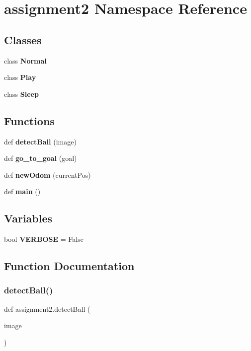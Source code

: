 \section{assignment2 Namespace Reference}
\label{namespaceassignment2}
\subsection*{Classes}
\begin{DoxyCompactItemize}
\item 
class \textbf{ Normal}
\item 
class \textbf{ Play}
\item 
class \textbf{ Sleep}
\end{DoxyCompactItemize}
\subsection*{Functions}
\begin{DoxyCompactItemize}
\item 
def \textbf{ detect\+Ball} (image)
\item 
def \textbf{ go\+\_\+to\+\_\+goal} (goal)
\item 
def \textbf{ new\+Odom} (current\+Pos)
\item 
def \textbf{ main} ()
\end{DoxyCompactItemize}
\subsection*{Variables}
\begin{DoxyCompactItemize}
\item 
bool \textbf{ V\+E\+R\+B\+O\+SE} = False
\end{DoxyCompactItemize}


\subsection{Function Documentation}
\mbox{\label{namespaceassignment2_a7d16703cc3805820e2ca219ca80b60e4}} 
\subsubsection{detect\+Ball()}
{\footnotesize\ttfamily def assignment2.\+detect\+Ball (\begin{DoxyParamCaption}\item[{}]{image }\end{DoxyParamCaption})}

